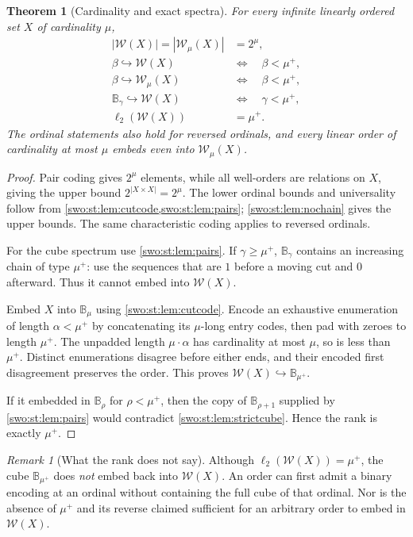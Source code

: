 \documentclass[11pt]{article}
\newtheorem{theorem}{Theorem}[section]
\theoremstyle{definition}
\theoremstyle{remark}
\newtheorem{remark}[remark]{Remark}
\newcommand{\WO}{\mathcal W}
\newcommand{\BB}{\mathbb B}
\newcommand{\bl}{\ell_2}
\newcommand{\emb}{\hookrightarrow}
\begin{document}
\begin{theorem}[Cardinality and exact spectra]\label{swo:st:thm:setspectrum}
For every infinite linearly ordered set $X$ of cardinality $\mu$,
\begin{align*}
 |\WO(X)|=|\WO_\mu(X)|&=2^\mu,\\
 \beta\emb\WO(X)\quad&\Longleftrightarrow\quad\beta<\mu^+,\\
 \beta\emb\WO_\mu(X)\quad&\Longleftrightarrow\quad\beta<\mu^+,\\
 \BB_\gamma\emb\WO(X)\quad&\Longleftrightarrow\quad\gamma<\mu^+,\\
 \bl(\WO(X))&=\mu^+.
\end{align*}
The ordinal statements also hold for reversed ordinals, and every
linear order of cardinality at most $\mu$ embeds even into
$\WO_\mu(X)$.
\end{theorem}
\begin{proof}
Pair coding gives $2^\mu$ elements, while all well-orders are relations
on $X$, giving the upper bound $2^{|X\times X|}=2^\mu$.
The lower ordinal bounds and universality follow from
\cref{swo:st:lem:cutcode,swo:st:lem:pairs}; \cref{swo:st:lem:nochain} gives the upper bounds.
The same characteristic coding applies to reversed ordinals.

For the cube spectrum use \cref{swo:st:lem:pairs}. If $\gamma\geq\mu^+$,
$\BB_\gamma$ contains an increasing chain of type $\mu^+$: use the
sequences that are $1$ before a moving cut and $0$ afterward. Thus it
cannot embed into $\WO(X)$.

Embed $X$ into $\BB_\mu$ using \cref{swo:st:lem:cutcode}. Encode an exhaustive
enumeration of length $\alpha<\mu^+$ by concatenating its $\mu$-long
entry codes, then pad with zeroes to length $\mu^+$. The unpadded length
$\mu\cdot\alpha$ has cardinality at most $\mu$, so is less than $\mu^+$.
Distinct enumerations disagree before either ends, and their encoded
first disagreement preserves the order. This proves
$\WO(X)\emb\BB_{\mu^+}$.

If it embedded in $\BB_\rho$ for $\rho<\mu^+$, then the copy of
$\BB_{\rho+1}$ supplied by \cref{swo:st:lem:pairs} would contradict
\cref{swo:st:lem:strictcube}. Hence the rank is exactly $\mu^+$.
\end{proof}

\begin{remark}[What the rank does not say]\label{swo:st:n9.7}
Although $\bl(\WO(X))=\mu^+$, the cube $\BB_{\mu^+}$ does \emph{not}
embed back into $\WO(X)$. An order can first admit a binary encoding at
an ordinal without containing the full cube of that ordinal.
Nor is the absence of $\mu^+$ and its reverse claimed sufficient for an
arbitrary order to embed in $\WO(X)$.
\end{remark}
\end{document}
